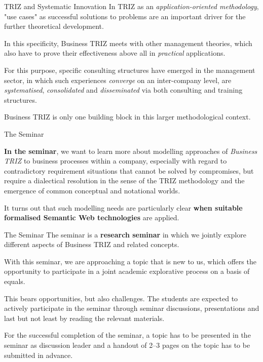 \documentclass{beamer}
\begin{document}
\begin{frame}{TRIZ and Systematic Innovation}
In TRIZ as an \emph{application-oriented methodology}, "use cases" as
successful solutions to problems are an important driver for the further
theoretical development.

In this specificity, Business TRIZ meets with other management theories, which
also have to prove their effectiveness above all in \emph{practical}
applications.

For this purpose, specific consulting structures have emerged in the
management sector, in which such experiences \emph{converge} on an
inter-company level, are \emph{systematised}, \emph{consolidated} and
\emph{disseminated} via both consulting and training structures.

Business TRIZ is only one building block in this larger methodological
context.
\end{frame}

\begin{frame}{The Seminar}

\textbf{In the seminar}, we want to learn more about modelling approaches of
\emph{Business TRIZ} to business processes within a company, especially with
regard to contradictory requirement situations that cannot be solved by
compromises, but require a dialectical resolution in the sense of the TRIZ
methodology and the emergence of common conceptual and notational worlds.

It turns out that such modelling needs are particularly clear \textbf{when
  suitable formalised Semantic Web technologies} are applied.

\end{frame}

\begin{frame}{The Seminar}
The seminar is a \textbf{research seminar} in which we jointly explore
different aspects of Business TRIZ and related concepts.

With this seminar, we are approaching a topic that is new to us, which offers
the opportunity to participate in a joint academic explorative process on a
basis of equals.

This bears opportunities, but also challenges.  The students are expected to
actively participate in the seminar through seminar discussions, presentations
and last but not least by reading the relevant materials.

For the successful completion of the seminar, a topic has to be presented in
the seminar as discussion leader and a handout of 2--3 pages on the topic has
to be submitted in advance.
\end{frame}
\end{document}
